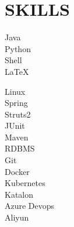 \documentclass[]{resume}
\begin{document}
\begin{minipage}[t]{0.3\textwidth}
\section{SKILLS}
Java \\ Python \\Shell \\ \LaTeX\
\sectionsep

Linux \\ Spring \\ Struts2 \\ JUnit \\ 
Maven \\ RDBMS \\ Git \\ Docker \\ Kubernetes \\ 
Katalon \\ Azure Devops \\ Aliyun

%
%

\end{minipage} 
\hfill
\end{document}
